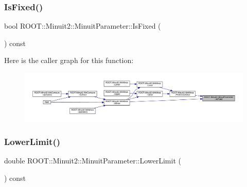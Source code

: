 \mbox{\label{classROOT_1_1Minuit2_1_1MinuitParameter_a2d7f48ed0d6d1ac124e390e54df4de32}} 
\subsubsection{\texorpdfstring{IsFixed()}{IsFixed()}\hspace{0.1cm}{\footnotesize\ttfamily [2/2]}}
{\footnotesize\ttfamily bool R\+O\+O\+T\+::\+Minuit2\+::\+Minuit\+Parameter\+::\+Is\+Fixed (\begin{DoxyParamCaption}{ }\end{DoxyParamCaption}) const\hspace{0.3cm}{\ttfamily [inline]}}

Here is the caller graph for this function\+:\nopagebreak
\begin{figure}[H]
\begin{center}
\leavevmode
\includegraphics[width=350pt]{dd/dfb/classROOT_1_1Minuit2_1_1MinuitParameter_a2d7f48ed0d6d1ac124e390e54df4de32_icgraph}
\end{center}
\end{figure}
\mbox{\label{classROOT_1_1Minuit2_1_1MinuitParameter_a25c7f30fc42264f1df96a3852d2e11a4}} 
\subsubsection{\texorpdfstring{LowerLimit()}{LowerLimit()}\hspace{0.1cm}{\footnotesize\ttfamily [1/2]}}
{\footnotesize\ttfamily double R\+O\+O\+T\+::\+Minuit2\+::\+Minuit\+Parameter\+::\+Lower\+Limit (\begin{DoxyParamCaption}{ }\end{DoxyParamCaption}) const\hspace{0.3cm}{\ttfamily [inline]}}


